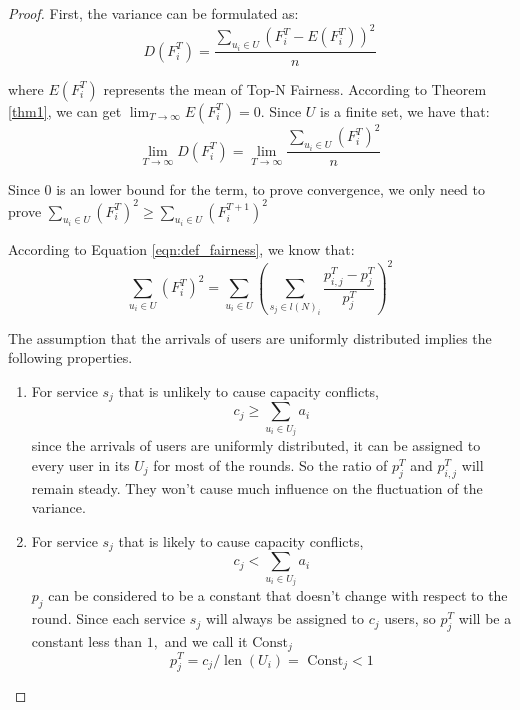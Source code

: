 \begin{proof}
First, the variance can be formulated as:
\begin{equation}
D\left(F_{i}^{T}\right)=\frac{\sum_{u_{i} \in U}\left(F_{i}^{T}-E\left(F_{i}^{T}\right)\right)^{2}}{n}
\label{thm2-1}
\end{equation}

where $E\left(F_{i}^{T}\right)$ represents the mean of Top-N Fairness. According to Theorem \ref{thm1}, we can get $\lim_{T\rightarrow\infty}E\left(F_{i}^{T}\right)=0$. Since $U$ is a finite set, we have that:
\begin{equation}
\lim_{T\rightarrow\infty} D\left(F_{i}^{T}\right)=\lim_{T\rightarrow\infty}\frac{\sum_{u_{i} \in U}\left(F_{i}^{T}\right)^{2}}{n}
\label{thm2-2}
\end{equation}

Since 0 is an lower bound for the term, to prove convergence, we only need to prove $\sum_{u_{i} \in U}\left(F_{i}^{T}\right)^{2} \geqslant \sum_{u_{i} \in U}\left(F_{i}^{T+1}\right)^{2}$

According to Equation \ref{eqn:def_fairness}, we know that:
\begin{equation}
\sum_{u_{i} \in U}\left(F_{i}^{T}\right)^{2}=\sum_{u_{i} \in U}\left(\sum_{s_{j} \in l(N)_{i}} \frac{p_{i, j}^{T}-p_{j}^{T}}{p_{j}^{T}}\right)^{2}
\label{thm2-3}
\end{equation}

The assumption that the arrivals of users are uniformly distributed implies the following properties.
\begin{enumerate}
    \item For service $s_j$ that is unlikely to cause capacity conflicts,
    \begin{equation}
        c_{j} \geqslant \sum_{u_i \in U_j} a_i
        \label{thm2-4}
    \end{equation}
    since the arrivals of users are uniformly distributed, it can be assigned to every user in its $U_j$ for most of the rounds. So the ratio of $p_j^T$ and $p^{T}_{i,j}$ will remain steady. They won't cause much influence on the fluctuation of the variance. 
    \item For service $s_j$ that is likely to cause capacity conflicts,
    \begin{equation}
        c_{j}<\sum_{u_i \in U_j} a_i
        \label{thm2-5}
    \end{equation}
    $p_j$ can be considered to be a constant that doesn't change with respect to the round. Since each service $s_j$ will always be assigned to $c_j$ users, so $p_{j}^{T}$ will be a constant less than $1,$ and we call it $\text{Const}_j$
    \begin{equation}
        p_{j}^{T}=c_{j} / \operatorname{len}\left(U_{i}\right)=\text { Const}_{j}<1
        \label{thm2-6}
    \end{equation}
\end{enumerate}





\end{proof}
